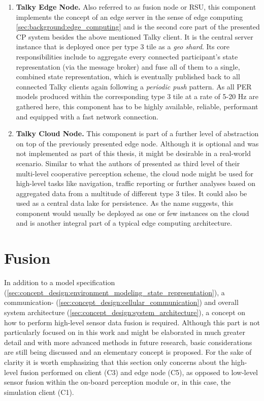\begin{enumerate}[C1: ]
	\item \textbf{Talky Edge Node.} Also referred to as fusion node or RSU, this component implements the concept of an edge server in the sense of edge computing \cref{sec:background:edge_computing} and is the second core part of the presented CP system besides the above mentioned Talky client. It is the central server instance that is deployed once per type 3 tile as a \textit{geo shard}. Its core responsibilities include to aggregate every connected participant's state representation (via the message broker) and fuse all of them to a single, combined state representation, which is eventually published back to all connected Talky clients again following a \textit{periodic push} pattern. As all PER models produced within the corresponding type 3 tile at a rate of 5-20 \si{\hertz} are gathered here, this component has to be highly available, reliable, performant and equipped with a fast network connection.
	\item \textbf{Talky Cloud Node.} This component is part of a further level of abstraction on top of the previously presented edge node. Although it is optional and was not implemented as part of this thesis, it might be desirable in a real-world scenario. Similar to what the authors of \cite{Calvo2017} presented as third level of their multi-level cooperative perception scheme, the cloud node might be used for high-level tasks like navigation, traffic reporting or further analyses based on aggregated data from a multitude of different type 3 tiles. It could also be used as a central data lake for persistence. As the name suggests, this component would usually be deployed as one or few instances on the cloud and is another integral part of a typical edge computing architecture. 
\end{enumerate}

\section{Fusion}
\label{sec:concept_design:fusion}
In addition to a model specification (\cref{sec:concept_design:environment_modeling_state_representation}), a communication- (\cref{sec:concept_design:cellular_communication}) and overall system architecture (\cref{sec:concept_design:system_architecture}), a concept on how to perform high-level sensor data fusion is required. Although this part is not particularly focused on in this work and might be elaborated in much greater detail and with more advanced methods in future research, basic considerations are still being discussed and an elementary concept is proposed. For the sake of clarity it is worth emphasizing that this section only concerns about the high-level fusion performed on client (C3) and edge node (C5), as opposed to low-level sensor fusion within the on-board perception module or, in this case, the simulation client (C1).

